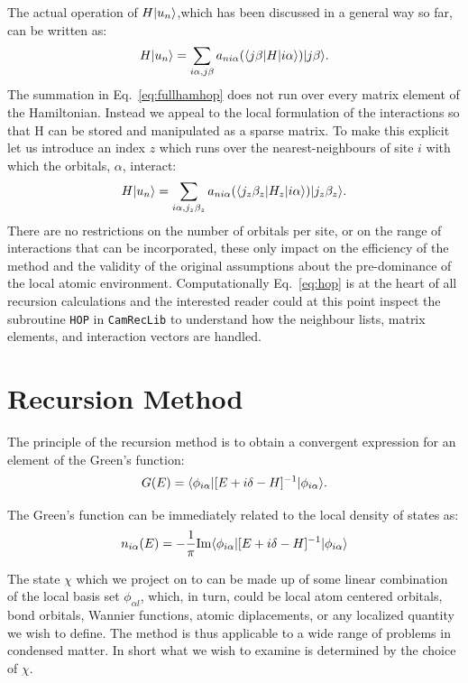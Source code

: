 The actual operation of $H|u_{n}\rangle$,which has been discussed in a general way so far, 
can be written as:
%
\begin{equation}
\label{eq:fullhamhop}
H|u_{n}\rangle = \sum_{i\alpha, j\beta}a_{n i\alpha }(\langle j\beta |H| i\alpha \rangle)|j \beta \rangle.
\end{equation}
%
The summation in Eq.~\ref{eq:fullhamhop} does not run over every matrix element of the Hamiltonian.
Instead we appeal to the local formulation of the interactions so that
H can be stored and manipulated as a sparse matrix. To make this explicit let us 
introduce an index $z$ which runs over the nearest-neighbours of 
site $i$ with which the orbitals, $\alpha$, interact:
%
\begin{equation}
\label{eq:hop}
H|u_{n}\rangle = \sum_{i\alpha, j_{z}\beta_{z}}a_{n i\alpha}(\langle j_{z}\beta_{z}|H_{z}|i\alpha\rangle)|j_{z}\beta_{z}\rangle.
\end{equation}
%
There are no restrictions on the number of orbitals per site, or on the range of interactions that can be
incorporated, these only impact on the efficiency of the method and the validity of the original assumptions
about the pre-dominance of the local atomic environment. Computationally Eq.~\ref{eq:hop} is at the
heart of all recursion calculations and the interested reader could at this point inspect the subroutine
\texttt{HOP} in \texttt{CamRecLib} to understand how the neighbour lists, matrix elements, and interaction
vectors are handled.

\section{Recursion Method}
The principle of the recursion method is to obtain a convergent expression 
for an element of the Green's function:
%
\begin{equation}
G(E) = \langle\phi_{i\alpha}|[E + i\delta -H]^{-1}|\phi_{i\alpha}\rangle.
\end{equation}
%

The Green's function can be immediately related to the local density of states as:
%
\begin{equation}
n_{i\alpha}(E) = -\frac{1}{\pi} {\rm Im}\langle \phi_{i\alpha} |[E + i\delta -H]^{-1}|\phi_{i\alpha}\rangle
\end{equation}
%

The state $\chi$ which we project on to can be made up of some linear combination 
of the local basis set $\phi_{\alpha l}$, which, in turn, could be local atom centered orbitals, bond orbitals, 
Wannier functions, atomic diplacements, or any localized quantity we wish to define. The method is thus
applicable to a wide range of problems in condensed matter. In short what we wish to examine
is determined by the choice of $\chi$.

